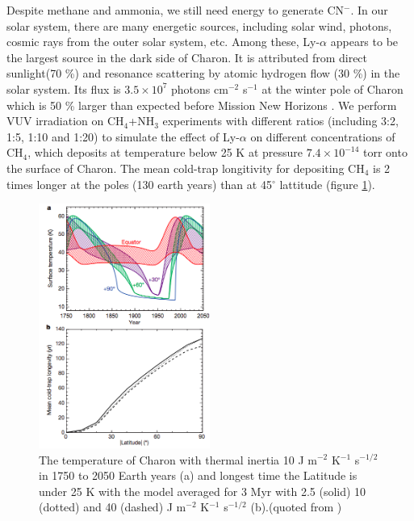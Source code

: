 Despite methane and ammonia, we still need energy to generate CN$^-$. In our solar system, there are many energetic sources, including solar wind, photons, cosmic rays from the outer solar system, etc. Among these, Ly-$\alpha$ appears to be the largest source in the dark side of Charon. It is attributed from direct sunlight(70 \%) and resonance scattering by atomic hydrogen flow (30 \%) in the solar system. Its flux is $3.5 \times 10^7$ photons cm$^{-2}$ s$^{-1}$ at the winter pole of Charon \cite{grundy2016formation} which is 50 \% larger than expected before Mission New Horizons \cite{gladstone2015lyalpha}. We perform VUV irradiation on CH$_4$+NH$_3$ experiments with different ratios (including 3:2, 1:5, 1:10 and 1:20) to simulate the effect of Ly-$\alpha$ on different concentrations of CH$_4$, which deposits at temperature below 25 K at pressure $7.4 \times 10^{-14}$ torr onto the surface of Charon. The mean cold-trap longitivity for depositing CH$_4$ is 2 times longer at the poles (130 earth years) than at 45$^{\circ}$ lattitude \cite{grundy2016formation} (figure \ref{fig:Charon_thermal}).

\begin{figure}
\centering
\includegraphics[width=0.5\textwidth]{figures/chapter1/thermal.png}
\caption{The temperature of Charon with thermal inertia 10 J m$^{-2}$ K$^{-1}$ s$^{-1/2}$ in 1750 to 2050 Earth years (a) and longest time the Latitude is under 25 K with the model averaged for 3 Myr with 2.5 (solid) 10 (dotted) and 40 (dashed) J m$^{-2}$ K$^{-1}$ s$^{-1/2}$ (b).(quoted from \cite{grundy2016formation})}
\label{fig:Charon_thermal}
\end{figure}

